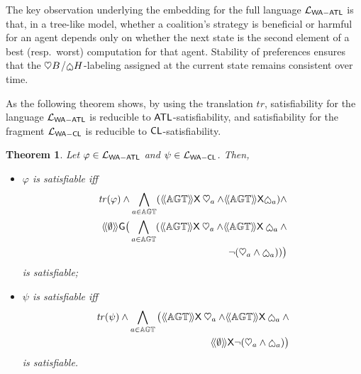 \documentclass{article}
\newtheorem{theorem}{Theorem}
\newcommand{\elnote}[1] {  \footnote{\textbf{EL}: #1} }
\begin{document}
 


The key observation underlying the embedding for the full language $\mathcal{L}_{\mathsf{WA{-}ATL}}$ is that, in a tree-like model, whether a coalition’s strategy is beneficial or harmful for an agent depends only on whether the next state is the second element of a best (resp.\ worst) computation for that agent. 
Stability of preferences ensures that the $\mathbin{\heartsuit} B$/$\harm \GroupH$-labeling assigned at the current state remains consistent over time.

As the following theorem shows, by using the translation $ \mathit{tr}$, satisfiability for the language $\mathcal{L}_{\mathsf{WA{-}ATL}}$ is reducible to $\mathsf{ATL}$-satisfiability, and satisfiability for the fragment $\mathcal{L}_{\mathsf{WA{-}CL}}$ is reducible to $\mathsf{CL} $-satisfiability. 
 \begin{theorem}\label{theo:embedding}
     Let $\varphi \in \mathcal{L}_{\mathsf{WA{-}ATL}} $
     and $\psi  \in \mathcal{L}_{\mathsf{WA{-}CL}} $. 
     Then, 
     \begin{itemize}
         \item $\varphi $
     is satisfiable 
     iff
     \begin{align*}
         \mathit{tr}(\varphi) \wedge \bigwedge_{a\in\AGT}(\atlop{\AGT}\X \help_a\wedge
     \atlop{\AGT}\X\harm_a)\wedge 
      \\
      \atlop{\emptyset }\G  \big(\bigwedge_{a\in\AGT}(\atlop{\AGT}\X  \help_a\wedge\atlop{\AGT}\X\harm_a \wedge \\
       \neg(\help_a\wedge\harm_a) )\big)
     \end{align*}
     is satisfiable;
     

     \item 
     $\psi $
     is satisfiable   
     iff 
       \begin{align*}
\mathit{tr}(\psi) \wedge \bigwedge_{a\in\AGT}
     \big(\atlop{\AGT}\X  \help_a\wedge\atlop{\AGT}\X\harm_a\wedge\\
     \atlop{\emptyset }\X\neg(\help_a\wedge\harm_a) \big)
         \end{align*} 
     is satisfiable.
     
     \end{itemize}



 \end{theorem}
\end{document}
